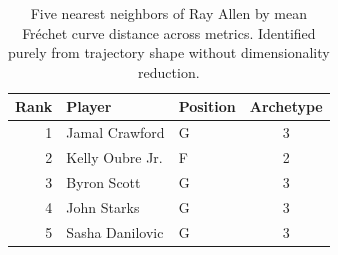 \begin{table}[htbp]
  \centering\small
  \begin{tabular}{rllc}
    \toprule
    Rank & Player & Position & Archetype \\
    \midrule
    1 & Jamal Crawford & G & 3 \\
    2 & Kelly Oubre Jr. & F & 2 \\
    3 & Byron Scott & G & 3 \\
    4 & John Starks & G & 3 \\
    5 & Sasha Danilovic & G & 3 \\
    \bottomrule
  \end{tabular}
  \caption{Five nearest neighbors of Ray Allen by mean Fr\'{e}chet curve distance across metrics. Identified purely from trajectory shape without dimensionality reduction.}
  \label{tab:Ray_Allen_frechet_curve_neighbors}
\end{table}

